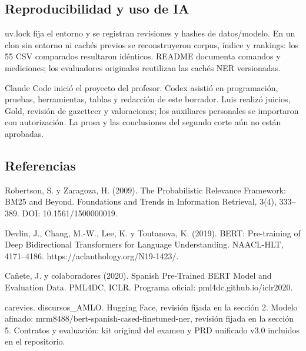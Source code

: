\documentclass[11pt,a4paper]{article}
\begin{document}
\subsection*{Reproducibilidad y uso de IA}
\par
uv.lock fija el entorno y se registran revisiones y hashes de datos/\allowbreak{}modelo. En un clon sin entorno ni cachés previos se reconstruyeron corpus, índice y rankings: los 55 CSV comparados resultaron idénticos. README documenta comandos y mediciones; los evaluadores originales reutilizan las cachés NER versionadas.
\par
Claude Code inició el proyecto del profesor. Codex asistió en programación, pruebas, herramientas, tablas y redacción de este borrador. Luis realizó juicios, Gold, revisión de gazetteer y valoraciones; los auxiliares personales se importaron con autorización. La prosa y las conclusiones del segundo corte aún no están aprobadas.
\par
\subsection*{Referencias}
\par
[1] Robertson, S. y Zaragoza, H. (2009). The Probabilistic Relevance Framework: BM25 and Beyond. Foundations and Trends in Information Retrieval, 3(4), 333–389. DOI: 10.1561/\allowbreak{}1500000019.
\par
[2] Devlin, J., Chang, M.-W., Lee, K. y Toutanova, K. (2019). BERT: Pre-training of Deep Bidirectional Transformers for Language Understanding. NAACL-HLT, 4171–4186. https:/\allowbreak{}/\allowbreak{}aclanthology.org/\allowbreak{}N19-1423/\allowbreak{}.
\par
[3] Cañete, J. y colaboradores (2020). Spanish Pre-Trained BERT Model and Evaluation Data. PML4DC, ICLR. Programa oficial: pml4dc.github.io/\allowbreak{}iclr2020.
\par
[4] carevies. discursos\_\allowbreak{}AMLO. Hugging Face, revisión fijada en la sección 2. Modelo afinado: mrm8488/\allowbreak{}bert-spanish-cased-finetuned-ner, revisión fijada en la sección 5. Contratos y evaluación: kit original del examen y PRD unificado v3.0 incluidos en el repositorio.
\end{document}
